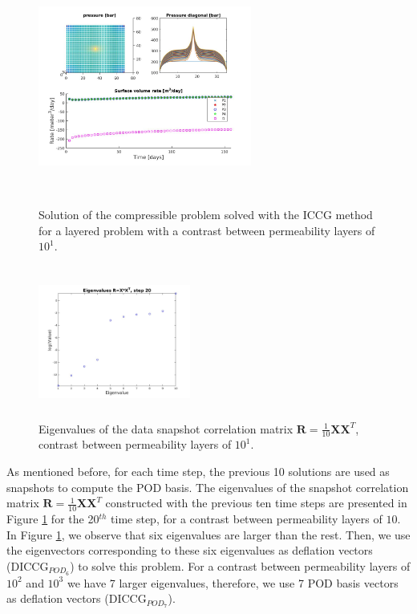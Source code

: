 \documentclass[review]{elsarticle}
\begin{document}
\begin{figure}[!h]
\centering
\hspace{-5mm}
\begin{minipage}{.5\textwidth}
 \centering
\includegraphics[width=7cm,height=7cm,keepaspectratio]
{images/solution.jpg}
\caption{Solution of the compressible problem solved with the ICCG method for a layered problem with a contrast between permeability layers of $10^{1}$.}
\label{fig:compsol_1}
\end{minipage}%
\hspace{5mm}
\begin{minipage}{.4\textwidth}
 \centering
 \vspace{5mm}
\includegraphics[width=5cm,height=5cm,keepaspectratio]{images/eig_pod2070.jpg}
\vspace{1mm}
\caption{Eigenvalues of the data snapshot correlation matrix $\mathbf{R}=\frac{1}{10}\mathbf{X}\mathbf{X}^T$, contrast between permeability layers of $10^{1}$.}
\label{fig:eig_POD_1}
\end{minipage}
\end{figure}
As mentioned before, for each time step, the previous 10 solutions are used as snapshots to compute the POD basis. The eigenvalues of the snapshot correlation matrix $\mathbf{R}=\frac{1}{10}\mathbf{X}\mathbf{X}^T$ constructed with the previous ten time steps are presented in Figure \ref{fig:eig_POD_1} for the 20$^{th}$ time step, for a contrast between permeability layers of $10$. In Figure \ref{fig:eig_POD_1}, we observe that six eigenvalues are larger than the rest. Then, we use the eigenvectors corresponding to these six eigenvalues as deflation vectors (DICCG$_{POD_6}$) to solve this problem. For a contrast between permeability layers of $10^{2}$ and $10^{3}$ we have 7 larger eigenvalues, therefore, we use 7 POD basis vectors as deflation vectors (DICCG$_{POD_7}$).  
\end{document}
